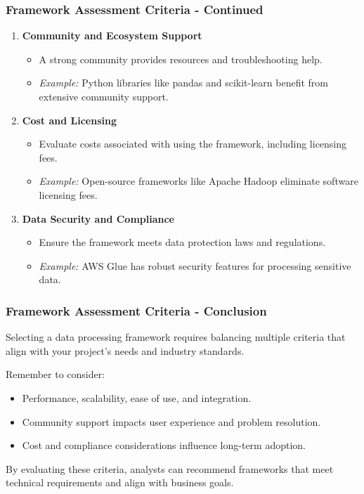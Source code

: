 \documentclass[aspectratio=169]{beamer}
\begin{document}
\begin{frame}[fragile]
    \frametitle{Framework Assessment Criteria - Continued}
    \begin{enumerate}[start=4]
        \item \textbf{Community and Ecosystem Support}
            \begin{itemize}
                \item A strong community provides resources and troubleshooting help.
                \item \textit{Example:} Python libraries like pandas and scikit-learn benefit from extensive community support.
            \end{itemize}
        
        \item \textbf{Cost and Licensing}
            \begin{itemize}
                \item Evaluate costs associated with using the framework, including licensing fees.
                \item \textit{Example:} Open-source frameworks like Apache Hadoop eliminate software licensing fees.
            \end{itemize}

        \item \textbf{Data Security and Compliance}
            \begin{itemize}
                \item Ensure the framework meets data protection laws and regulations.
                \item \textit{Example:} AWS Glue has robust security features for processing sensitive data.
            \end{itemize}
    \end{enumerate}
\end{frame}

\begin{frame}[fragile]
    \frametitle{Framework Assessment Criteria - Conclusion}
    Selecting a data processing framework requires balancing multiple criteria that align with your project's needs and industry standards. 

    Remember to consider:
    \begin{itemize}
        \item Performance, scalability, ease of use, and integration.
        \item Community support impacts user experience and problem resolution.
        \item Cost and compliance considerations influence long-term adoption.
    \end{itemize}
    
    By evaluating these criteria, analysts can recommend frameworks that meet technical requirements and align with business goals.
\end{frame}
\end{document}
